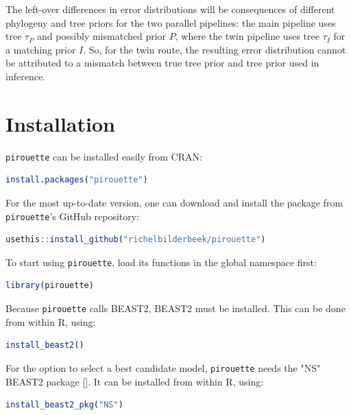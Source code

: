 \documentclass{article}
\begin{document}
The left-over differences in error distributions will be 
consequences of different phylogeny and tree priors for the two parallel 
pipelines: the main pipeline uses tree $\tau_{\mathit{P}}$ and
possibly mismatched prior $\mathit{P}$, where the twin pipeline
uses tree $\tau_{\mathit{I}}$ for a matching prior $\mathit{I}$.
So, for the twin route, the resulting error distribution cannot be 
attributed to a mismatch between true tree prior and tree prior used in
inference.

\section{Installation}

\verb;pirouette; can be installed easily from CRAN:
\begin{lstlisting}[language=R, floatplacement=ht, frame=single]
install.packages("pirouette")
\end{lstlisting}

For the most up-to-date version, 
one can download and install the package from \verb;pirouette;'s GitHub 
repository:

\begin{lstlisting}[language=R, floatplacement=ht, frame=single]
usethis::install_github("richelbilderbeek/pirouette")
\end{lstlisting}

To start using \verb;pirouette;, load its functions in the global namespace 
first:

\begin{lstlisting}[language=R, floatplacement=ht, frame=single]
library(pirouette)
\end{lstlisting}
Because \verb;pirouette; calls BEAST2, BEAST2 must be installed. 
This can be done from within R, using:

\begin{lstlisting}[language=R, floatplacement=ht, frame=single]
install_beast2()
\end{lstlisting}
For the option to select a best candidate model,
\verb;pirouette; needs the "NS" BEAST2 package [\cite{maturana2018model}].
It can be installed from within R, using:

\begin{lstlisting}[language=R, floatplacement=ht, frame=single]
install_beast2_pkg("NS")
\end{lstlisting}
\end{document}

